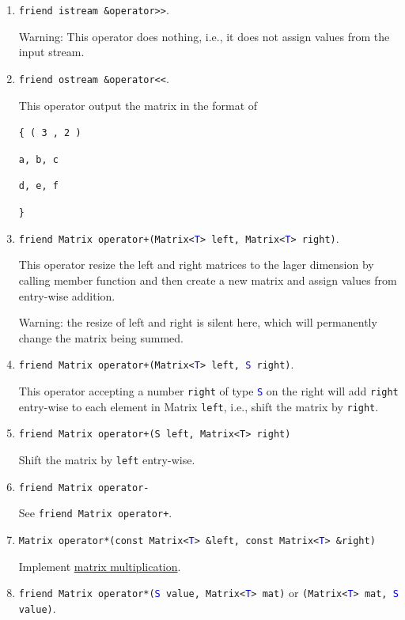 \documentclass[11pt,a4paper]{article}
\newcommand{\myuline}[1]{%
	\uline{\phantom{#1}}%
	\llap{\contour{white}{#1}}%
}
\newcommand{\tref}[2]{\hyperref[#2]{\textcolor{blue}{\myuline{\texttt{#1}}}}}
\newcommand{\ttype}[1]{\textcolor{blue}{\texttt{#1}}}
\theoremstyle{definition}
\theoremstyle{definition}
\numberwithin{equation}{section}
\begin{document}
	\begin{enumerate}
		\item \texttt{friend istream \&operator>>}.
		
		Warning: This operator does nothing, i.e., it does not assign values from the input stream.
		\item \texttt{friend ostream \&operator<<}.
		
		This operator output the matrix in the format of
		
		\texttt{\{ ( 3 , 2 )}
		
		\texttt{a, b, c}
		
		\texttt{d, e, f}
		
		\texttt{\}}
		\item \texttt{friend Matrix operator+(Matrix<\ttype{T}> left, Matrix<\ttype{T}> right)}.
		
		This operator resize the left and right matrices to the lager dimension by calling member function \tref{resize}{MatrixResize} and then create a new matrix and assign values from entry-wise addition.
		
		Warning: the resize of left and right is silent here, which will permanently change the matrix being summed.
		
		\item \texttt{friend Matrix operator+(Matrix<\ttype{T}> left, \ttype{S} right)}.
		
		This operator accepting a number \texttt{right} of type \ttype{S} on the right will add \texttt{right} entry-wise to each element in Matrix \texttt{left}, i.e., shift the matrix by \texttt{right}.
		
		\item \texttt{friend Matrix operator+(S left, Matrix<T> right)}
		
		Shift the matrix by \texttt{left} entry-wise.
		
		\item \texttt{friend Matrix operator-}
		
		See \texttt{friend Matrix operator+}.
		
		\item \texttt{Matrix operator*(const Matrix<\ttype{T}> \&left, const Matrix<\ttype{T}> \&right)}
		
		Implement \href{https://en.wikipedia.org/wiki/Matrix_multiplication}{matrix multiplication}.
		
		\item \texttt{friend Matrix operator*(\ttype{S} value, Matrix<\ttype{T}> mat)} or \texttt{(Matrix<\ttype{T}> mat, \ttype{S} value)}.
		

\end{enumerate}
\end{document}
